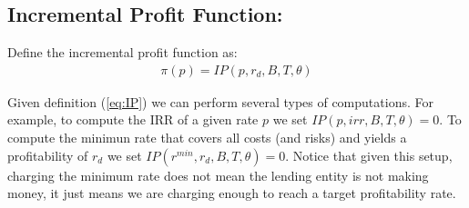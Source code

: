 \subsection{ Incremental Profit Function: }
Define the incremental profit function as:
\begin{align}
\pi(p)=IP(p,r_d,B,T,\theta) \label{eq:IP}
\end{align}

Given definition (\ref{eq:IP}) we can perform several types of computations. For example, to compute the IRR of a given rate $p$ we set $IP(p,irr,B,T,\theta)=0$. To compute the minimun rate that covers all costs (and risks) and yields a profitability of $r_d$ we set $IP(r^{min},r_d,B,T,\theta)=0$. Notice that given this setup, charging the minimum rate does not mean the lending entity is not making money, it just means we are charging enough to reach a target profitability rate.
